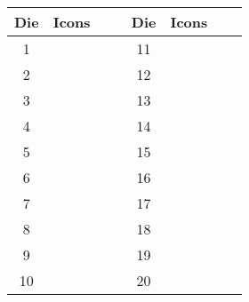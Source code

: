 \begin{tabular}{c@{\hskip 6pt}c@{\hskip 3pt}c@{\hskip 3pt}c@{\hskip 6pt}c@{\hskip 6pt}c@{\hskip 3pt}c@{\hskip 3pt}c}\toprule
Die & \multicolumn{3}{c}{Icons\ \ \ \,} & Die & \multicolumn{3}{c}{Icons\ \ \ \,} \\ \midrule
\phantom{1}1 & \raisebox{-0.25ex}{\drawonestar{}} & \raisebox{-0.25ex}{\drawtwostar{}} & \raisebox{-0.25ex}{\drawthreestar{}} & 11 & \raisebox{-0.25ex}{\drawfourstar{}} & \raisebox{-0.25ex}{\drawfivestar{}} & \raisebox{-0.25ex}{\drawsixstar{}} \\[0.5ex]
\phantom{1}2 & \raisebox{-0.25ex}{\drawonestar{}} & \raisebox{-0.25ex}{\drawtwostar{}} & \raisebox{-0.25ex}{\drawfourstar{}} & 12 & \raisebox{-0.25ex}{\drawthreestar{}} & \raisebox{-0.25ex}{\drawfivestar{}} & \raisebox{-0.25ex}{\drawsixstar{}} \\[0.5ex]
\phantom{1}3 & \raisebox{-0.25ex}{\drawonestar{}} & \raisebox{-0.25ex}{\drawtwostar{}} & \raisebox{-0.25ex}{\drawfivestar{}} & 13 & \raisebox{-0.25ex}{\drawthreestar{}} & \raisebox{-0.25ex}{\drawfourstar{}} & \raisebox{-0.25ex}{\drawsixstar{}} \\[0.5ex]
\phantom{1}4 & \raisebox{-0.25ex}{\drawonestar{}} & \raisebox{-0.25ex}{\drawtwostar{}} & \raisebox{-0.25ex}{\drawsixstar{}} & 14 & \raisebox{-0.25ex}{\drawthreestar{}} & \raisebox{-0.25ex}{\drawfourstar{}} & \raisebox{-0.25ex}{\drawfivestar{}} \\[0.5ex]
\phantom{1}5 & \raisebox{-0.25ex}{\drawonestar{}} & \raisebox{-0.25ex}{\drawthreestar{}} & \raisebox{-0.25ex}{\drawfourstar{}} & 15 & \raisebox{-0.25ex}{\drawtwostar{}} & \raisebox{-0.25ex}{\drawfivestar{}} & \raisebox{-0.25ex}{\drawsixstar{}} \\[0.5ex]
\phantom{1}6 & \raisebox{-0.25ex}{\drawonestar{}} & \raisebox{-0.25ex}{\drawthreestar{}} & \raisebox{-0.25ex}{\drawfivestar{}} & 16 & \raisebox{-0.25ex}{\drawtwostar{}} & \raisebox{-0.25ex}{\drawfourstar{}} & \raisebox{-0.25ex}{\drawsixstar{}} \\[0.5ex]
\phantom{1}7 & \raisebox{-0.25ex}{\drawonestar{}} & \raisebox{-0.25ex}{\drawthreestar{}} & \raisebox{-0.25ex}{\drawsixstar{}} & 17 & \raisebox{-0.25ex}{\drawtwostar{}} & \raisebox{-0.25ex}{\drawfourstar{}} & \raisebox{-0.25ex}{\drawfivestar{}} \\[0.5ex]
\phantom{1}8 & \raisebox{-0.25ex}{\drawonestar{}} & \raisebox{-0.25ex}{\drawfourstar{}} & \raisebox{-0.25ex}{\drawfivestar{}} & 18 & \raisebox{-0.25ex}{\drawtwostar{}} & \raisebox{-0.25ex}{\drawthreestar{}} & \raisebox{-0.25ex}{\drawsixstar{}} \\[0.5ex]
\phantom{1}9 & \raisebox{-0.25ex}{\drawonestar{}} & \raisebox{-0.25ex}{\drawfourstar{}} & \raisebox{-0.25ex}{\drawsixstar{}} & 19 & \raisebox{-0.25ex}{\drawtwostar{}} & \raisebox{-0.25ex}{\drawthreestar{}} & \raisebox{-0.25ex}{\drawfivestar{}} \\[0.5ex]
10 & \raisebox{-0.25ex}{\drawonestar{}} & \raisebox{-0.25ex}{\drawfivestar{}} & \raisebox{-0.25ex}{\drawsixstar{}} & 20 & \raisebox{-0.25ex}{\drawtwostar{}} & \raisebox{-0.25ex}{\drawthreestar{}} & \raisebox{-0.25ex}{\drawfourstar{}} \\ \bottomrule
\end{tabular}%
